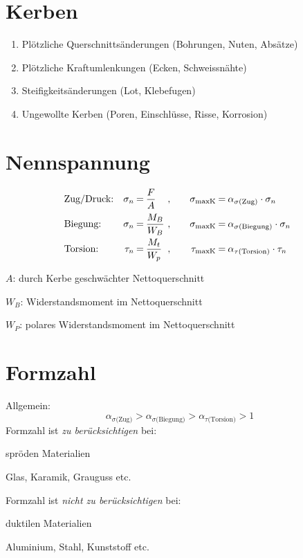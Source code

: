 
\section{Kerben} %
	\begin{enumerate}
		\item Plötzliche Querschnittsänderungen (Bohrungen, Nuten, Absätze)
		\item Plötzliche Kraftumlenkungen (Ecken, Schweissnähte)
		\item Steifigkeitsänderungen (Lot, Klebefugen)
		\item Ungewollte Kerben (Poren, Einschlüsse, Risse, Korrosion)
	\end{enumerate}
\section{Nennspannung} %
	\begin{equation*}
		\begin{array}{@{}l@{\quad}r@{\:=\:}l@{\ ,\qquad}r@{\:=\:}l}
			\text{Zug/Druck:} & \sigma_n & \displaystyle\frac{F}{A} & \sigma_{\text{maxK}} & \alpha_{\sigma\text{(Zug)}}\cdot \sigma_n \\[2ex]
			\text{Biegung:} & \sigma_n & \displaystyle\frac{M_B}{W_B} & \sigma_{\text{maxK}} & \alpha_{\sigma\text{(Biegung)}}\cdot \sigma_n \\[2ex]
			\text{Torsion:} & \tau_n & \displaystyle\frac{M_t}{W_p} & \tau_{\text{maxK}} & \alpha_{\tau\text{(Torsion)}}\cdot \tau_n
		\end{array}
	\end{equation*}
	\begin{tightitemize}
		\item[$A$:] durch Kerbe geschwächter Nettoquerschnitt
		\item[$W_B$:] Widerstandsmoment im Nettoquerschnitt
		\item[$W_P$:] polares Widerstandsmoment im Nettoquerschnitt
	\end{tightitemize}
\section{Formzahl} %
	Allgemein:
	\begin{equation*}
		\alpha_{\sigma\text{(Zug)}} > \alpha_{\sigma\text{(Biegung)}} > \alpha_{\tau\text{(Torsion)}} > 1
	\end{equation*}
	Formzahl ist \emph{zu berücksichtigen} bei:
	\begin{tightitemize}
		\item spröden Materialien
		\item Glas, Karamik, Grauguss etc.
	\end{tightitemize}
	Formzahl ist \emph{nicht zu berücksichtigen} bei:
	\begin{tightitemize}
		\item duktilen Materialien
		\item Aluminium, Stahl, Kunststoff etc.
	\end{tightitemize}
	
